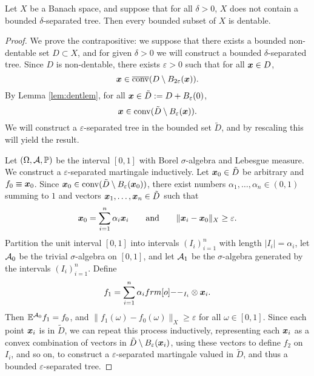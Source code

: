 \begin{thm}
  Let $X$ be a Banach space, and suppose that for all $\delta > 0$, $X$ does not contain a bounded $\delta$-separated tree.
  Then every bounded subset of $X$ is dentable.
\end{thm}
  
\begin{proof}
  We prove the contrapositive: we suppose that there exists a bounded non-dentable set $D \subset X$, and for given $\delta > 0$ we will construct a bounded $\delta$-separated tree.
  Since $D$ is non-dentable, there exists $\varepsilon > 0$ such that for all $\bm{x} \in D$,
  \begin{equation*}
    \bm{x} \in \overline{\mathrm{conv}}(D \setminus B_{2\varepsilon}(\bm{x})).
  \end{equation*}
  By Lemma \ref{lem:dentlem}, for all $\bm{x} \in \tilde{D} := D + B_{\varepsilon}(0)$,
  \begin{equation*}
    \bm{x} \in \mathrm{conv}(\tilde{D} \setminus B_{\varepsilon}(\bm{x})).
  \end{equation*}
  We will construct a $\varepsilon$-separated tree in the bounded set $\tilde{D}$, and by rescaling this will yield the result.

  Let $(\Omega,\mathcal{A},\mathbb{P})$ be the interval $[0,1]$ with Borel $\sigma$-algebra and Lebesgue measure.
  We construct a $\varepsilon$-separated martingale inductively.
  Let $\bm{x}_{0} \in \tilde{D}$ be arbitrary and $f_0 \equiv \bm{x}_0$.
  Since $\bm{x}_0 \in \mathrm{conv}(\tilde{D} \setminus B_{\varepsilon}(\bm{x}_0))$, there exist numbers $\alpha_1,\ldots, \alpha_n \in (0,1)$ summing to $1$ and vectors $\bm{x}_{1}, \ldots, \bm{x}_{n} \in \tilde{D}$ such that
  \begin{equation*}
    \bm{x}_0 = \sum_{i=1}^{n} \alpha_{i} \bm{x}_{i} \qquad \text{and} \qquad \|\bm{x}_{i} - \bm{x}_{0}\|_X \geq \varepsilon.
  \end{equation*}
  Partition the unit interval $[0,1]$ into intervals $(I_i)_{i=1}^{n}$ with length $|I_{i}| = \alpha_{i}$, let $\mathcal{A}_{0}$ be the trivial $\sigma$-algebra on $[0,1]$, and let $\mathcal{A}_{1}$ be the $\sigma$-algebra generated by the intervals $(I_i)_{i=1}^{n}$.
  Define
  \begin{equation*}
    f_1 = \sum_{i=1}^{n} \alpha_i \1_{I_i} \otimes \mb{x}_{i}.
  \end{equation*}
  Then $\mathbb{E}^{\mathcal{A}_0} f_1 = f_0$, and $\|f_1(\omega) - f_0(\omega)\|_{X} \geq \varepsilon$ for all $\omega \in [0,1]$.
  Since each point $\bm{x}_{i}$ is in $\tilde{D}$, we can repeat this process inductively, representing each $\bm{x}_{i}$ as a convex combination of vectors in $\tilde{D} \setminus B_{\varepsilon}(\bm{x}_i)$, using these vectors to define $f_2$ on $I_{i}$, and so on, to construct a $\varepsilon$-separated martingale valued in $\tilde{D}$, and thus a bounded $\varepsilon$-separated tree.
\end{proof}

